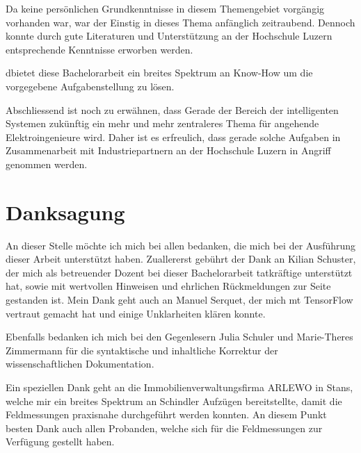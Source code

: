 Da keine persönlichen Grundkenntnisse in diesem Themengebiet vorgängig vorhanden war, war der Einstig in dieses Thema anfänglich zeitraubend. Dennoch konnte durch gute Literaturen und Unterstützung an der Hochschule Luzern entsprechende Kenntnisse erworben werden. 

dbietet diese Bachelorarbeit ein breites Spektrum an Know-How um die vorgegebene Aufgabenstellung zu lösen.

Abschliessend ist noch zu erwähnen, dass   Gerade der Bereich der intelligenten Systemen zukünftig ein mehr und mehr zentraleres Thema für angehende Elektroingenieure wird. Daher ist es erfreulich, dass gerade solche Aufgaben in Zusammenarbeit mit Industriepartnern an der Hochschule Luzern in Angriff genommen werden.



  



\section{Danksagung}

An dieser Stelle möchte ich mich bei allen bedanken, die mich bei der Ausführung dieser
Arbeit unterstützt haben. 
Zuallererst gebührt der Dank an Kilian Schuster, der mich als betreuender Dozent bei dieser Bachelorarbeit tatkräftige unterstützt hat, sowie mit wertvollen Hinweisen und ehrlichen Rückmeldungen zur Seite gestanden ist. Mein Dank geht auch an Manuel Serquet, der mich mt TensorFlow vertraut gemacht hat und einige Unklarheiten klären konnte. 

Ebenfalls bedanken ich mich bei den Gegenlesern Julia Schuler und Marie-Theres Zimmermann für die syntaktische und inhaltliche Korrektur der wissenschaftlichen Dokumentation.

Ein speziellen Dank geht an die Immobilienverwaltungsfirma ARLEWO in Stans, welche mir ein breites Spektrum an Schindler Aufzügen bereitstellte, damit die Feldmessungen praxisnahe durchgeführt werden konnten. An diesem Punkt besten Dank auch allen Probanden, welche sich für die Feldmessungen zur Verfügung gestellt haben.